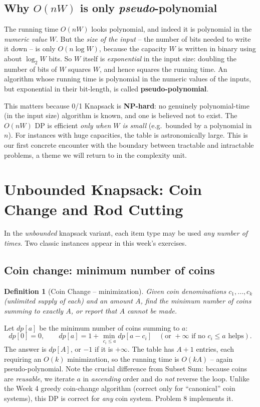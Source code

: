 \documentclass[11pt]{article}
\newtheorem{definition}[theorem]{Definition}
\begin{document}
\subsection{Why $O(nW)$ is only \emph{pseudo}-polynomial}

The running time $O(nW)$ looks polynomial, and indeed it is polynomial in the
\emph{numeric value} $W$. But the \emph{size of the input} -- the number of bits needed to
write it down -- is only $O(n \log W)$, because the capacity $W$ is written in binary using
about $\log_2 W$ bits. So $W$ itself is \emph{exponential} in the input size: doubling the
number of bits of $W$ squares $W$, and hence squares the running time. An algorithm whose
running time is polynomial in the numeric values of the inputs, but exponential in their
bit-length, is called \textbf{pseudo-polynomial}.

This matters because 0/1 Knapsack is \textbf{NP-hard}: no genuinely polynomial-time (in
the input size) algorithm is known, and one is believed not to exist. The $O(nW)$ DP is
efficient \emph{only when $W$ is small} (e.g.\ bounded by a polynomial in $n$). For
instances with huge capacities, the table is astronomically large. This is our first
concrete encounter with the boundary between tractable and intractable problems, a theme
we will return to in the complexity unit.

\section{Unbounded Knapsack: Coin Change and Rod Cutting}

In the \emph{unbounded} knapsack variant, each item type may be used \emph{any number of
times}. Two classic instances appear in this week's exercises.

\subsection{Coin change: minimum number of coins}

\begin{definition}[Coin Change -- minimization]
Given coin denominations $c_1, \ldots, c_k$ (unlimited supply of each) and an amount $A$,
find the minimum number of coins summing to exactly $A$, or report that $A$ cannot be
made.
\end{definition}

Let $\mathit{dp}[a]$ be the minimum number of coins summing to $a$:
\[
\mathit{dp}[0] = 0, \qquad
\mathit{dp}[a] = 1 + \min_{\,c_i \le a} \mathit{dp}[a - c_i]
\quad(\text{or } +\infty \text{ if no } c_i \le a \text{ helps}).
\]
The answer is $\mathit{dp}[A]$, or $-1$ if it is $+\infty$. The table has $A+1$ entries,
each requiring an $O(k)$ minimization, so the running time is $O(kA)$ -- again
pseudo-polynomial. Note the crucial difference from Subset Sum: because coins are
\emph{reusable}, we iterate $a$ in \emph{ascending} order and do \emph{not} reverse the
loop. Unlike the Week 4 greedy coin-change algorithm (correct only for ``canonical'' coin
systems), this DP is correct for \emph{any} coin system. Problem 8 implements it.
\end{document}
